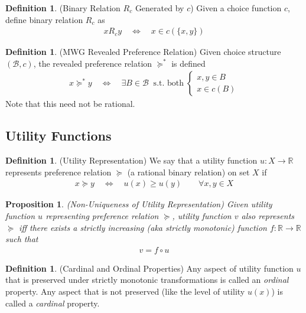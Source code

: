 \documentclass[12pt]{article}
\theoremstyle{plain}
\newtheorem{prop}[thm]{Proposition}
\theoremstyle{definition}
\newtheorem{defn}[thm]{Definition}
\theoremstyle{remark}
\newcommand{\ra}{\rightarrow}
\newcommand{\calB}{\mathcal{B}}
\newcommand{\R}{\mathbb{R}}
\begin{document}
\begin{defn}(Binary Relation $R_c$ Generated by $c$)
Given a choice function $c$, define binary relation $R_c$ as
\begin{align*}
  xR_c y \quad\iff\quad
  x \in c(\{x,y\})
\end{align*}
\end{defn}

\begin{defn}(MWG Revealed Preference Relation)
Given choice structure $(\calB, c)$, the revealed preference relation
$\succeq^*$ is defined
\begin{align*}
  x \succeq^* y
  \quad\iff\quad
  \exists B\in\calB\;\; \text{s.t. both}\;
  \begin{cases}
    x,y\in B \\
    x\in c(B)
  \end{cases}
\end{align*}
Note that this need not be rational.
\end{defn}



\subsection{Utility Functions}

\begin{defn}(Utility Representation)
We say that a utility function $u: X\ra \R$ represents preference
relation $\succeq$ (a rational binary relation) on set $X$ if
\begin{align*}
  x\succeq y
  \quad\iff\quad
  u(x) \geq u(y)
  \qquad\forall x,y\in X
\end{align*}
\end{defn}

\begin{prop}(Non-Uniqueness of Utility Representation)
Given utility function $u$ representing preference relation $\succeq$,
utility function $v$ also represents $\succeq$ iff
there exists a \emph{strictly} increasing (aka strictly monotonic)
function $f:\R\ra\R$ such that
\begin{align*}
  v = f \circ u
\end{align*}
\end{prop}

\begin{defn}(Cardinal and Ordinal Properties)
Any aspect of utility function $u$ that is preserved under strictly
monotonic transformations is called an \emph{ordinal} property.  Any
aspect that is not preserved (like the level of utility $u(x)$) is
called a \emph{cardinal} property.
\end{defn}
\end{document}
